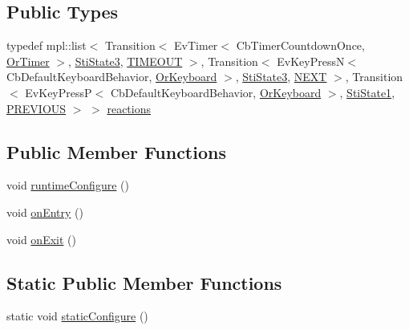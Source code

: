 \subsection*{Public Types}
\begin{DoxyCompactItemize}
\item 
typedef mpl\+::list$<$ Transition$<$ Ev\+Timer$<$ Cb\+Timer\+Countdown\+Once, \hyperlink{classsm__three__some_1_1OrTimer}{Or\+Timer} $>$, \hyperlink{structsm__three__some_1_1inner__states_1_1StiState3}{Sti\+State3}, \hyperlink{structsm__three__some_1_1inner__states_1_1StiState2_1_1TIMEOUT}{T\+I\+M\+E\+O\+UT} $>$, Transition$<$ Ev\+Key\+PressN$<$ Cb\+Default\+Keyboard\+Behavior, \hyperlink{classsm__three__some_1_1OrKeyboard}{Or\+Keyboard} $>$, \hyperlink{structsm__three__some_1_1inner__states_1_1StiState3}{Sti\+State3}, \hyperlink{structsm__three__some_1_1inner__states_1_1StiState2_1_1NEXT}{N\+E\+XT} $>$, Transition$<$ Ev\+Key\+PressP$<$ Cb\+Default\+Keyboard\+Behavior, \hyperlink{classsm__three__some_1_1OrKeyboard}{Or\+Keyboard} $>$, \hyperlink{structsm__three__some_1_1inner__states_1_1StiState1}{Sti\+State1}, \hyperlink{structsm__three__some_1_1inner__states_1_1StiState2_1_1PREVIOUS}{P\+R\+E\+V\+I\+O\+US} $>$ $>$ \hyperlink{structsm__three__some_1_1inner__states_1_1StiState2_a35556a3ab61ab56f2aa5d896b8330082}{reactions}
\end{DoxyCompactItemize}
\subsection*{Public Member Functions}
\begin{DoxyCompactItemize}
\item 
void \hyperlink{structsm__three__some_1_1inner__states_1_1StiState2_a46bf7c838fb2cbf92e5b17b17165af41}{runtime\+Configure} ()
\item 
void \hyperlink{structsm__three__some_1_1inner__states_1_1StiState2_a71c494eeec8ee133d157f40f64c455cf}{on\+Entry} ()
\item 
void \hyperlink{structsm__three__some_1_1inner__states_1_1StiState2_a853417ccfaacf0c0d9040ab0774e6588}{on\+Exit} ()
\end{DoxyCompactItemize}
\subsection*{Static Public Member Functions}
\begin{DoxyCompactItemize}
\item 
static void \hyperlink{structsm__three__some_1_1inner__states_1_1StiState2_a52ec97e0ac51c91508349adf358045ea}{static\+Configure} ()
\end{DoxyCompactItemize}

